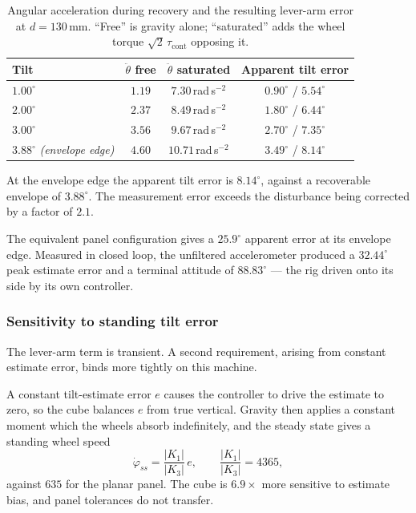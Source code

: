 \begin{table}[htbp]
\centering
\small
\begin{tabular}{@{}lccc@{}}
\toprule
\textbf{Tilt} & $\ddot\theta$ \textbf{free} & $\ddot\theta$ \textbf{saturated}
& \textbf{Apparent tilt error}\\
\midrule
$1.00^\circ$ & $1.19$ & $7.30$\,rad\,s$^{-2}$ & $0.90^\circ$ / $5.54^\circ$\\
$2.00^\circ$ & $2.37$ & $8.49$\,rad\,s$^{-2}$ & $1.80^\circ$ / $6.44^\circ$\\
$3.00^\circ$ & $3.56$ & $9.67$\,rad\,s$^{-2}$ & $2.70^\circ$ / $7.35^\circ$\\
$3.88^\circ$ \emph{(envelope edge)} & $4.60$ & $10.71$\,rad\,s$^{-2}$
  & $3.49^\circ$ / $8.14^\circ$\\
\bottomrule
\end{tabular}
\caption{Angular acceleration during recovery and the resulting lever-arm
error at $d = 130$\,mm. ``Free'' is gravity alone; ``saturated'' adds the
wheel torque $\sqrt{2}\,\tau_{\mathrm{cont}}$ opposing it.}
\label{tab:lever-arm}
\end{table}

At the envelope edge the apparent tilt error is $8.14^\circ$, against a
recoverable envelope of $3.88^\circ$. The measurement error exceeds the
disturbance being corrected by a factor of $2.1$.

The equivalent panel configuration gives a $25.9^\circ$ apparent error at its
envelope edge. Measured in closed loop, the unfiltered accelerometer produced
a $32.44^\circ$ peak estimate error and a terminal attitude of $88.83^\circ$
--- the rig driven onto its side by its own controller.

\subsubsection{Sensitivity to standing tilt error}
\label{sec:bias-sensitivity}

The lever-arm term is transient. A second requirement, arising from constant
estimate error, binds more tightly on this machine.

A constant tilt-estimate error $e$ causes the controller to drive the estimate
to zero, so the cube balances $e$ from true vertical. Gravity then applies a
constant moment which the wheels absorb indefinitely, and the steady state
gives a standing wheel speed
%
\begin{equation}
  \dot\varphi_{ss} = \frac{|K_1|}{|K_3|}\,e,
  \qquad \frac{|K_1|}{|K_3|} = 4365 ,
  \label{eq:standing-wheel}
\end{equation}
%
against $635$ for the planar panel. The cube is $6.9\times$ more sensitive to
estimate bias, and panel tolerances do not transfer.

